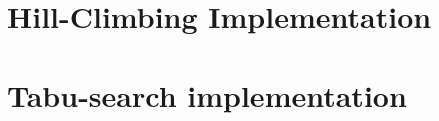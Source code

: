 \documentclass{article}
\begin{document}
\appendix

\section{Hill-Climbing Implementation}




\section{Tabu-search implementation}


\end{document}
